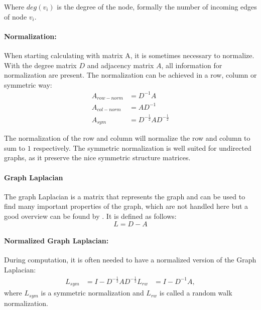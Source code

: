 Where $deg(v_i)$ is the degree of the node, formally the number of incoming edges of node $v_i$.

\paragraph{Normalization:}
When starting calculating with matrix A, it is sometimes necessary to normalize.
With the degree matrix $D$ and adjacency matrix $A$, all information for normalization are present.
The normalization can be achieved in a row, column or symmetric way:
\begin{equation}
    \begin{aligned}
        A_{row-norm} &= D^{-1} A \\
        A_{col-norm} &= A D^{-1} \\
        A_{sym}      &=  D^{-\frac{1}{2}} A D^{-\frac{1}{2}}    
    \end{aligned}
\end{equation}

The normalization of the row and column will normalize the row and column to sum to $1$ respectively.
The symmetric normalization is well suited for undirected graphs, as it preserve the nice symmetric structure matrices.


\paragraph{Graph Laplacian}
The graph Laplacian is a matrix that represents the graph and can be used to find many important properties of the graph, 
which are not handled here but a good overview can be found by \cite{tutorialSpectralClustering, SpectralGraphTheory}. 
It is defined as follows:
\begin{equation}
    L = D - A
\end{equation}

\paragraph{Normalized Graph Laplacian:}
During computation, it is often needed to have a normalized version of the Graph Laplacian: \newline
\begin{equation}
    \label{eq:normalizedGraphLaplacian}
    \begin{aligned}
        L_{sym} &= I - D^{-\frac{1}{2}} A D^{-\frac{1}{2}}
        L_{rw}  &= I - D^{-1} A,
    \end{aligned}
\end{equation}
where $L_{sym}$ is a symmetric normalization and $L_{rw}$ is called a random walk normalization.

